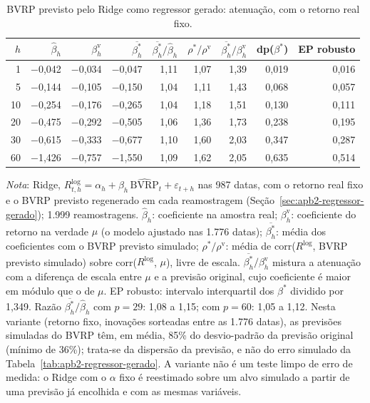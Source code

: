 \begin{table}[H]
\centering
\footnotesize
\caption{BVRP previsto pelo Ridge como regressor gerado: atenuação, com o retorno real fixo.}
\label{tab:apb2-atenuacao}
\begin{tabular}{rrrrrrrrr}
\toprule
$h$ & $\hat\beta_h$ & $\beta^{\text{v}}_h$ & $\overline{\beta^*_h}$ & $\overline{\beta^*_h}/\hat\beta_h$ & $\rho^*/\rho^{\text{v}}$ & $\overline{\beta^*_h}/\beta^{\text{v}}_h$ & dp($\beta^*$) & EP robusto \\
\midrule
1 & $-$0{,}042 & $-$0{,}034 & $-$0{,}047 & 1{,}11 & 1{,}07 & 1{,}39 & 0{,}019 & 0{,}016 \\
5 & $-$0{,}144 & $-$0{,}105 & $-$0{,}150 & 1{,}04 & 1{,}11 & 1{,}43 & 0{,}068 & 0{,}057 \\
10 & $-$0{,}254 & $-$0{,}176 & $-$0{,}265 & 1{,}04 & 1{,}18 & 1{,}51 & 0{,}130 & 0{,}111 \\
20 & $-$0{,}475 & $-$0{,}292 & $-$0{,}505 & 1{,}06 & 1{,}36 & 1{,}73 & 0{,}238 & 0{,}195 \\
30 & $-$0{,}615 & $-$0{,}333 & $-$0{,}677 & 1{,}10 & 1{,}60 & 2{,}03 & 0{,}347 & 0{,}287 \\
60 & $-$1{,}426 & $-$0{,}757 & $-$1{,}550 & 1{,}09 & 1{,}62 & 2{,}05 & 0{,}635 & 0{,}514 \\
\bottomrule
\end{tabular}
\par\smallskip
\parbox{0.95\linewidth}{\footnotesize\textit{Nota}: Ridge, $R^{\log}_{t,h} = \alpha_h + \beta_h\,\widehat{\text{BVRP}}_t + \varepsilon_{t+h}$ nas 987 datas, com o retorno real fixo e o BVRP previsto regenerado em cada reamostragem (Seção~\ref{sec:apb2-regressor-gerado}); 1{.}999 reamostragens. $\hat\beta_h$: coeficiente na amostra real; $\beta^{\text{v}}_h$: coeficiente do retorno na verdade $\mu$ (o modelo ajustado nas 1.776 datas); $\overline{\beta^*_h}$: média dos coeficientes com o BVRP previsto simulado; $\rho^*/\rho^{\text{v}}$: média de corr($R^{\log}$, BVRP previsto simulado) sobre corr($R^{\log}$, $\mu$), livre de escala. $\overline{\beta^*_h}/\beta^{\text{v}}_h$ mistura a atenuação com a diferença de escala entre $\mu$ e a previsão original, cujo coeficiente é maior em módulo que o de $\mu$. EP robusto: intervalo interquartil dos $\beta^*$ dividido por 1,349. Razão $\overline{\beta^*_h}/\hat\beta_h$ com $p = 29$: 1{,}08 a 1{,}15; com $p = 60$: 1{,}05 a 1{,}12. Nesta variante (retorno fixo, inovações sorteadas entre as 1.776 datas), as previsões simuladas do BVRP têm, em média, 85\% do desvio-padrão da previsão original (mínimo de 36\%); trata-se da dispersão da previsão, e não do erro simulado da Tabela~\ref{tab:apb2-regressor-gerado}. A variante não é um teste limpo de erro de medida: o Ridge com o $\alpha$ fixo é reestimado sobre um alvo simulado a partir de uma previsão já encolhida e com as mesmas variáveis.}
\end{table}
